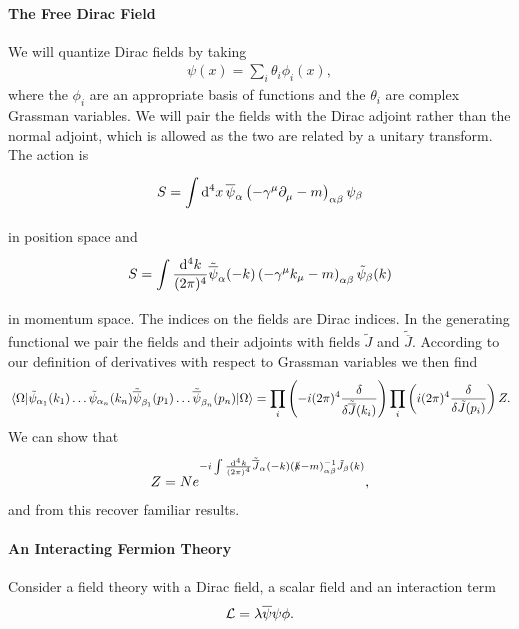 \paragraph{The Free Dirac Field}
We will quantize Dirac fields by taking
\begin{align*}
	\psi(x) = \sum\limits_{i}\theta_{i}\phi_{i}(x),
\end{align*}
where the $\phi_{i}$ are an appropriate basis of functions and the $\theta_{i}$ are complex Grassman variables. We will pair the fields with the Dirac adjoint rather than the normal adjoint, which is allowed as the two are related by a unitary transform. The action is
\begin{align*}
	S = \int\limits_{}^{}\dd[4]{x}\overline{\psi}_{\alpha}\left(-\gamma^{\mu}\partial^{}_{\mu} - m\right)_{\alpha\beta}\psi_{\beta}
\end{align*}
in position space and
\begin{align*}
	S = \int\limits_{}^{}\frac{\dd[4]{k}}{(2\pi)^{4}}\tilde{\overline{\psi}}_{\alpha}(-k)\left(-\gamma^{\mu}k_{\mu} - m\right)_{\alpha\beta}\tilde{\psi}_{\beta}(k)
\end{align*}
in momentum space. The indices on the fields are Dirac indices. In the generating functional we pair the fields and their adjoints with fields $\tilde{J}$ and $\tilde{\overline{J}}$. According to our definition of derivatives with respect to Grassman variables we then find
\begin{align*}
	\expval{\tilde{\psi}_{\alpha_{1}}(k_{1})\dots\tilde{\psi}_{\alpha_{n}}(k_{n})\tilde{\overline{\psi}}_{\beta_{1}}(p_{1})\dots\tilde{\overline{\psi}}_{\beta_{n}}(p_{n})}{\Omega} = \prod\limits_{i}\left(-i(2\pi)^{4}\fdv{\tilde{\overline{J}}(k_{i})}\right)\prod\limits_{i}\left(i(2\pi)^{4}\fdv{\tilde{J}(p_{i})}\right)Z.
\end{align*}
We can show that
\begin{align*}
	Z = Ne^{-i\int\limits_{}^{}\frac{\dd[4]{k}}{(2\pi)^{4}}\tilde{\overline{J}}_{\alpha}(-k)(\slashed{k} - m)_{\alpha\beta}^{-1}\tilde{J}_{\beta}(k)},
\end{align*}
and from this recover familiar results.

\paragraph{An Interacting Fermion Theory}
Consider a field theory with a Dirac field, a scalar field and an interaction term
\begin{align*}
	\mathcal{L} = \lambda\overline{\psi}\psi\phi.
\end{align*}